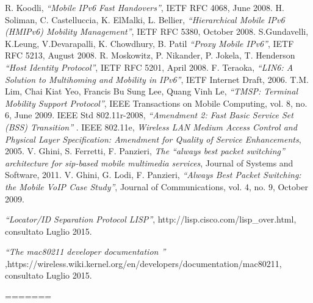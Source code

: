 \begin{thebibliography}{90}
 R. Koodli, \textit{``Mobile IPv6 Fast Handovers''}, IETF RFC 4068, June 2008.
  H. Soliman, C. Castelluccia, K. ElMalki, L. Bellier, \textit{``Hierarchical Mobile IPv6 (HMIPv6) Mobility Management''}, IETF RFC 5380, October 2008.
 S.Gundavelli, K.Leung, V.Devarapalli, K. Chowdhury, B. Patil \textit{``Proxy Mobile IPv6''}, IETF RFC 5213, August 2008.
 R. Moskowitz, P. Nikander, P. Jokela, T. Henderson \textit{``Host Identity Protocol''}, IETF RFC 5201, April 2008. 
 F. Teraoka, \textit{``LIN6: A Solution to Multihoming and Mobility in IPv6''}, IETF Internet Draft, 2006.
	T.M. Lim, Chai Kiat Yeo, Francis Bu Sung Lee, Quang Vinh Le, \textit{``TMSP: Terminal Mobility Support Protocol''}, IEEE Transactions on Mobile Computing, vol. 8, no. 6, June 2009.
 IEEE Std 802.11r-2008, \textit{``Amendment 2: Fast Basic Service Set (BSS) Transition''} .
 IEEE 802.11e, \textit{ Wireless LAN Medium Access Control and Physical Layer Specification: Amendment for Quality of Service Enhancements}, 2005.
 V. Ghini, S. Ferretti, F. Panzieri, \textit{The ``always best packet switching'' architecture for sip-based mobile multimedia services}, Journal of Systems and Software, 2011.
 V. Ghini, G. Lodi, F. Panzieri, \textit{``Always Best Packet Switching: the Mobile VoIP Case Study''}, Journal of Communications, vol. 4, no. 9, October 2009.

 \textit{``Locator/ID Separation Protocol LISP''}, http://lisp.cisco.com/lisp\_over.html, consultato Luglio 2015.

 \textit{``The  mac80211 developer documentation ''} ,https://wireless.wiki.kernel.org/en/developers/documentation/mac80211, consultato Luglio 2015.
\end{thebibliography}
=======
